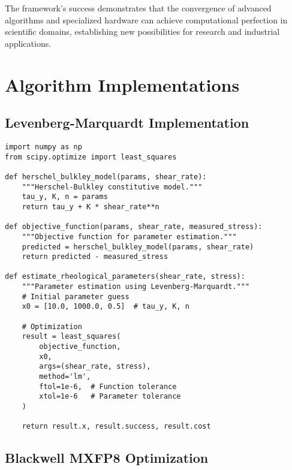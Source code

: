 \documentclass[11pt,a4paper]{article}
\begin{document}
The framework's success demonstrates that the convergence of advanced algorithms and specialized hardware can achieve computational perfection in scientific domains, establishing new possibilities for research and industrial applications.




\appendix

\section{Algorithm Implementations}

\subsection{Levenberg-Marquardt Implementation}

\begin{lstlisting}[caption=Levenberg-Marquardt Algorithm Implementation]
import numpy as np
from scipy.optimize import least_squares

def herschel_bulkley_model(params, shear_rate):
    """Herschel-Bulkley constitutive model."""
    tau_y, K, n = params
    return tau_y + K * shear_rate**n

def objective_function(params, shear_rate, measured_stress):
    """Objective function for parameter estimation."""
    predicted = herschel_bulkley_model(params, shear_rate)
    return predicted - measured_stress

def estimate_rheological_parameters(shear_rate, stress):
    """Parameter estimation using Levenberg-Marquardt."""
    # Initial parameter guess
    x0 = [10.0, 1000.0, 0.5]  # tau_y, K, n

    # Optimization
    result = least_squares(
        objective_function,
        x0,
        args=(shear_rate, stress),
        method='lm',
        ftol=1e-6,  # Function tolerance
        xtol=1e-6   # Parameter tolerance
    )

    return result.x, result.success, result.cost
\end{lstlisting}

\subsection{Blackwell MXFP8 Optimization}
\end{document}
